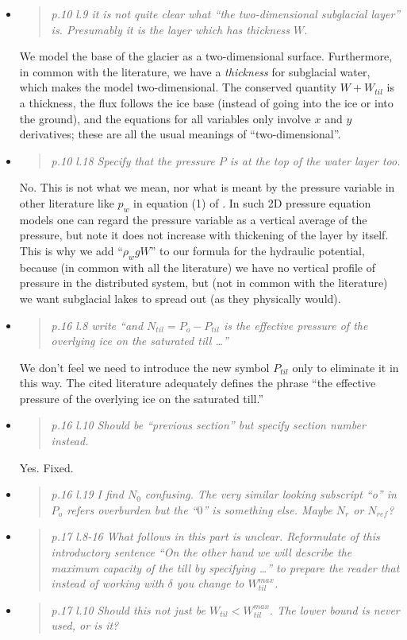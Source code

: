 \documentclass[11pt,reqno]{amsart}
\newcommand{\reply}[2]{
\medskip\medskip
\item  \begin{quote}
\emph{#1}
\end{quote}

\medskip
\noindent #2}
\begin{document}
\begin{itemize}
\reply{p.10 l.9 it is not quite clear what ``the two-dimensional subglacial layer'' is. Presumably it is the layer which has thickness $W$.}
{We model the base of the glacier as a two-dimensional surface.  Furthermore, in common with the literature, we have a \emph{thickness} for subglacial water, which makes the model two-dimensional.  The conserved quantity $W+W_{til}$ is a thickness, the flux follows the ice base (instead of going into the ice or into the ground), and the equations for all variables only involve $x$ and $y$ derivatives; these are all the usual meanings of ``two-dimensional''.}

\reply{p.10 l.18 Specify that the pressure $P$ is at the top of the water layer too.}
{No.  This is not what we mean, nor what is meant by the pressure variable in other literature like $p_w$ in equation (1) of \cite{Werderetal2013}.  In such 2D pressure equation models one can regard the pressure variable as a vertical average of the pressure, but note it does not increase with thickening of the layer by itself.  This is why we add ``$\rho_w g W$'' to our formula for the hydraulic potential, because (in common with all the literature) we have no vertical profile of pressure in the distributed system, but (not in common with the literature) we want subglacial lakes to spread out (as they physically would).}

\reply{p.16 l.8 write ``and $N_{til} = P_o-P_{til}$ is the effective pressure of the overlying ice on the saturated till \dots''}
{We don't feel we need to introduce the new symbol $P_{til}$ only to eliminate it in this way.  The cited literature adequately defines the phrase ``the effective pressure of the overlying ice on the saturated till.''}

\reply{p.16 l.10 Should be ``previous section'' but specify section number instead.}
{Yes.  Fixed.}

\reply{p.16 l.19 I find $N_0$ confusing. The very similar looking subscript ``o'' in $P_o$ refers overburden but the ``$0$'' is something else. Maybe $N_r$ or $N_{ref}$?}
{}

\reply{p.17 l.8-16 What follows in this part is unclear. Reformulate of this introductory sentence ``On the other hand we will describe the maximum capacity of the till by specifying \dots'' to prepare the reader that instead of working with $\delta$ you change to $W_{til}^{max}$.}
{}

\reply{p.17 l.10 Should this not just be $W_{til} < W_{til}^{max}$.  The lower bound is never used, or is it?}
{}


\end{itemize}
\end{document}
